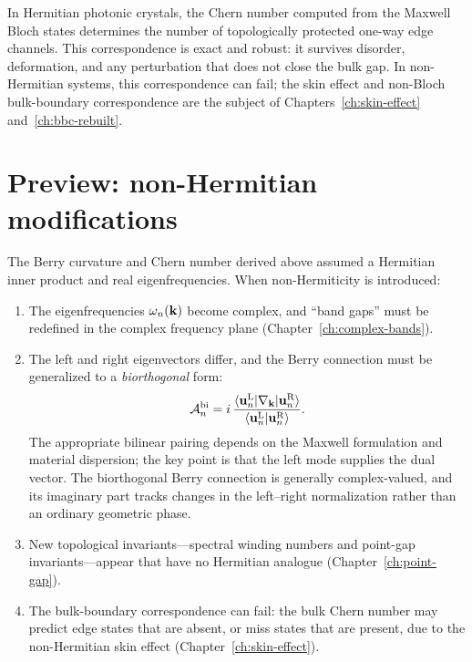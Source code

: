 \begin{takeaway}
In Hermitian photonic crystals, the Chern number computed from the
Maxwell Bloch states determines the number of topologically protected
one-way edge channels. This correspondence is exact and robust: it
survives disorder, deformation, and any perturbation that does not close
the bulk gap. In non-Hermitian systems, this correspondence can fail;
the skin effect and non-Bloch bulk-boundary correspondence are the
subject of Chapters~\ref{ch:skin-effect} and~\ref{ch:bbc-rebuilt}.
\end{takeaway}


\section{Preview: non-Hermitian modifications}
\label{sec:nh-berry-preview}

The Berry curvature and Chern number derived above assumed a Hermitian
inner product and real eigenfrequencies. When non-Hermiticity is
introduced:
\begin{enumerate}
 \item The eigenfrequencies $\omega_n(\mathbf{k})$ become complex, and ``band
 gaps'' must be redefined in the complex frequency plane
 (Chapter~\ref{ch:complex-bands}).
 \item The left and right eigenvectors differ, and the Berry
 connection must be generalized to a \emph{biorthogonal} form:
 \begin{equation}
 \mathcal{A}_n^{\mathrm{bi}} = i\,
 \frac{\langle\mathbf{u}_n^{\mathrm{L}}|\nabla_{\mathbf{k}}|\mathbf{u}_n^{\mathrm{R}}\rangle}
 {\langle\mathbf{u}_n^{\mathrm{L}}|\mathbf{u}_n^{\mathrm{R}}\rangle}.
 \label{eq:biorthogonal-berry-preview}
 \end{equation}
 The appropriate bilinear pairing depends on the Maxwell formulation
 and material dispersion; the key point is that the left mode supplies
 the dual vector. The biorthogonal Berry connection is generally
 complex-valued, and its imaginary part tracks changes in the
 left--right normalization rather than an ordinary geometric phase.
 \item New topological invariants---spectral winding numbers and
 point-gap invariants---appear that have no Hermitian analogue
 (Chapter~\ref{ch:point-gap}).
 \item The bulk-boundary correspondence can fail: the bulk Chern number
 may predict edge states that are absent, or miss states that are
 present, due to the non-Hermitian skin effect
 (Chapter~\ref{ch:skin-effect}).
\end{enumerate}

